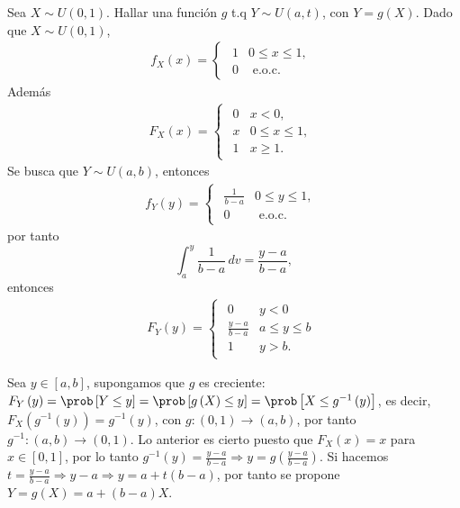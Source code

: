 \begin{Ejem} Sea $X \sim  U\left(0,1\right)$. Hallar una funci\'on $g$ t.q $Y\sim U\left(a,t\right)$, con  $Y=g\left(X\right)$. Dado que $X\sim U\left(0,1\right)$, 
\begin{eqnarray*}
f_{X}\left(x\right) =
\begin{cases}
\begin{array}{lc}
1  & 0\leq x \leq 1, \\
0 & \textrm{ e.o.c.}
\end{array}
\end{cases}
\end{eqnarray*}
Adem\'as
\begin{eqnarray*}
F_{X}\left(x\right)=
\begin{cases}
\begin{array}{lc}
0  & x<0 ,\\
x & 0\leq x \leq 1, \\
1 & x \geq 1.
\end{array}
\end{cases}
\end{eqnarray*}
Se busca que $Y\sim U\left(a,b\right)$, entonces
\begin{eqnarray*}
f_{Y}\left(y\right)=
\begin{cases}
\begin{array}{lc}
\frac{1}{b-a}  & 0\leq y \leq 1, \\
0 & \textrm{ e.o.c.}
\end{array}
\end{cases}
\end{eqnarray*}
por tanto
$$\int_{a}^{y}\frac{1}{b-a} \, dv = \dfrac{y-a}{b-a},$$ entonces
\begin{eqnarray*}
F_{Y}\left(y\right)=
\begin{cases}
\begin{array}{lc}
0  & y<0 \\
\frac{y-a}{b-a} & a\leq y \leq b \\
1 & y > b.
\end{array}
\end{cases}
\end{eqnarray*}

Sea $y \in \left[a,b\right]$, supongamos que  $g$ es creciente:
$F_{Y}\left(y\right)=\prob \left[Y\leq y\right]= \prob\left[g\left(X\right)\leq y\right]= \prob\left[X\leq g^{-1}\left(y\right)\right]$, es decir, $F_{X}\left(g^{-1}\left(y\right)\right)=g^{-1}\left(y\right)$, con $g:\left(0,1\right) \rightarrow \left(a,b\right)$, por tanto $g^{-1}:\left(a,b\right) \rightarrow \left(0,1\right)$. Lo anterior es cierto puesto que 
$F_{X}\left(x\right)=x$ para $x \in \left[0,1\right]$, por lo tanto $g^{-1}\left(y\right) = \frac{y-a}{b-a} \Rightarrow y =g\left(\frac{y-a}{b-a}\right)$. 
Si hacemos $t=\frac{y-a}{b-a}\Rightarrow y-a \Rightarrow y=a+t\left(b-a\right)$, por tanto se propone
$Y=g\left(X\right) = a+ \left(b-a\right)X$.
\end{Ejem}

